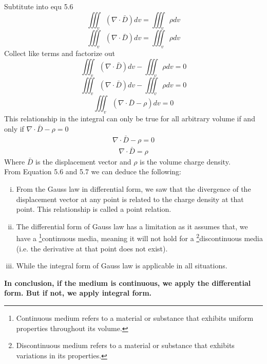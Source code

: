 Subtitute into equ 5.6
\begin{equation*}
	\iiint_v(\nabla\cdot \bar{D})dv = \iiint_v\rho dv
\end{equation*}
\begin{equation*}
	\iiint_v(\nabla\cdot \bar{D})dv = \iiint_v\rho dv
\end{equation*}
Collect like terms and factorize out
\begin{equation*}
	\iiint_v(\nabla\cdot \bar{D})dv - \iiint_v\rho dv = 0
\end{equation*}
\begin{equation*}
	\iiint_v(\nabla\cdot \bar{D})dv - \iiint_v\rho dv = 0
\end{equation*}
\begin{equation*}
	\iiint_v(\nabla\cdot \bar{D} - \rho)dv = 0
\end{equation*}
This relationship in the integral can only be
true for all arbitrary volume if and only if $\nabla\cdot\bar{D} - \rho = 0$
\begin{align*}
	\nabla \cdot \bar{D} - \rho = 0
\end{align*}
\begin{align}
	\boxed{\nabla \cdot \bar{D} = \rho}
\end{align}
Where $\bar{D}$ is the displacement vector and $\rho$ is the volume charge density.\\
From Equation 5.6 and 5.7 we can deduce the following:
\begin{enumerate}[(i)]
	\item From the Gauss law in differential form, we saw that the divergence of the displacement vector at any point is related to the charge density at that point. This relationship is called a point relation.
	\item The differential form of Gauss law has a limitation as it assumes that, we have a \footnote[7]{ Continuous medium refers to a material or substance that exhibits uniform properties throughout its volume.}continuous media, meaning it will not hold for a \footnote[8]{Discontinuous medium refers to a material or substance that exhibits variations in its properties.}discontinuous media (i.e. the derivative at that point does not exist).
	\item While the integral form of Gauss law is applicable in all situations.
\end{enumerate}
\textbf{In conclusion, if the medium is continuous, we apply the differential form. But if not, we apply integral form.}

